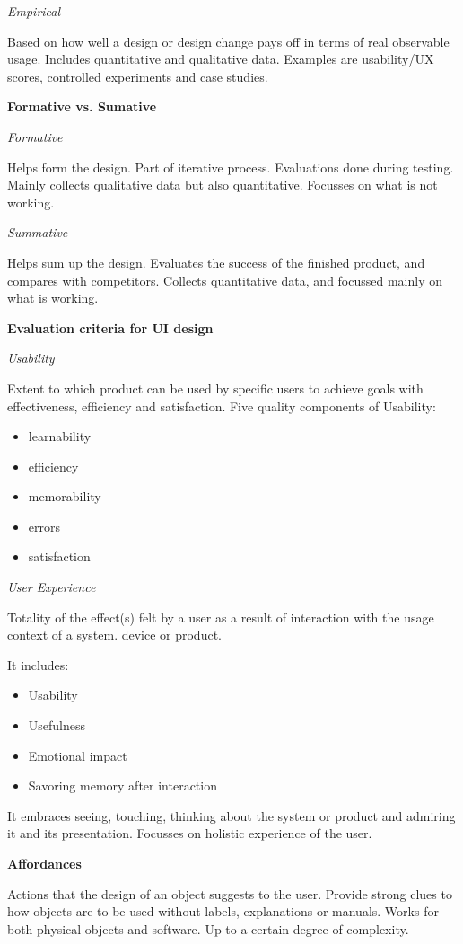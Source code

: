 \textit{Empirical} \smallskip

Based on how well a design or design change pays off in terms of real observable usage. Includes quantitative and qualitative data. 
Examples are usability/UX scores, controlled experiments and case studies. \medskip

\textbf{Formative vs. Sumative} \smallskip

\textit{Formative} \smallskip

Helps form the design. Part of iterative process. Evaluations done during testing. Mainly collects qualitative data but also quantitative. Focusses on what is not working.\smallskip

\textit{Summative} \smallskip

Helps sum up the design. Evaluates the success of the finished product, and compares with competitors. Collects quantitative data, and focussed mainly on what is working. \medskip


\textbf{Evaluation criteria for UI design} \smallskip

\textit{Usability} \smallskip

Extent to which product can be used by specific users to achieve goals with effectiveness, efficiency and satisfaction.
\smallskip
Five quality components of Usability:

\begin{multicols}{2}
    \begin{itemize}[itemsep=-5pt, topsep=-20pt, leftmargin=*]
	\item learnability
	\item efficiency
	\item memorability
	\item errors
	\item satisfaction
	\end{itemize}
\end{multicols}

\columnbreak

\textit{User Experience} \smallskip

Totality of the effect(s) felt by a user as a result of interaction with the usage context of a system. device or product. 

It includes:  
\begin{multicols}{2}
    \begin{itemize}[itemsep=-5pt, topsep=-20pt, leftmargin=*]
	\item Usability
	\item Usefulness
	\item Emotional impact
	\item Savoring memory after interaction
	\end{itemize}
\end{multicols}
It embraces seeing, touching, thinking about the system or product and admiring it and its presentation.
Focusses on holistic experience of the user. \medskip


\textbf{Affordances} \smallskip 

Actions that the design of an object suggests to the user. Provide strong clues to how objects are to be used without labels, explanations or manuals.
Works for both physical objects and software. Up to a certain degree of complexity. 